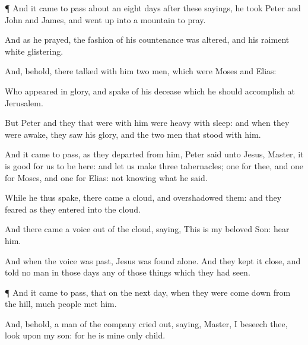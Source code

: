{





\par }{\PP {}¶
And it came to
pass
about
an
eight
days
after
these
sayings, he
took
Peter
and
John
and
James, and went
up
into a
mountain to
pray.

And
as
he
prayed, the
fashion
of
his
countenance was
altered,
and
his
raiment
{}
white
{}
glistering.

And,
behold, there talked
with
him
two
men,
which
were
Moses
and
Elias:

Who
appeared
in
glory, and
spake
of
his
decease
which he
should
accomplish
at
Jerusalem.

But
Peter
and they that
were
with
him were
heavy with
sleep:
and when they were
awake, they
saw
his
glory,
and
the
two
men that stood
with
him.

And it came to
pass,
as
they
departed
from
him,
Peter
said
unto
Jesus,
Master, it
is
good for
us to
be
here:
and let us
make
three
tabernacles;
one for
thee,
and
one for
Moses,
and
one for
Elias:
not
knowing
what he
said.

While
he
thus
spake, there
came a
cloud,
and
overshadowed
them:
and they
feared
as
they
entered
into the
cloud.

And there
came a
voice
out of the
cloud,
saying,
This
is
my
beloved
Son:
hear
him.

And
when the
voice was
past,
Jesus was
found
alone.
And
they kept it
close,
and
told no
man
in
those
days
any of those things
which they had
seen.


\par }{\PP {}¶
And it came to pass,
that
on
the
next
day,
when
they were come
down
from the
hill,
much
people
met
him.

And,
behold, a
man
of the
company cried
out,
saying,
Master, I
beseech
thee,
look
upon
my
son:
for he
is
mine only
child.

}
